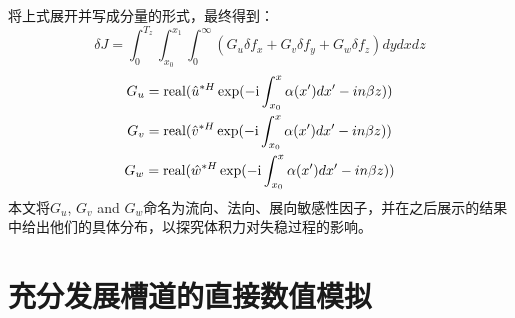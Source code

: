 将上式展开并写成分量的形式，最终得到：
\begin{equation}
\label{e:adjointresult}
\delta J = \int_0^{T_z } {\int_{x_0 }^{x_1 } {\int_0^\infty  {\left( {G_u \delta f_x  + G_v \delta f_y  + G_w \delta f_z } \right)dydxdz} } }
\end{equation}
\begin{equation}
\label{e:G}
\begin{gathered}
G_u  = {\rm real}(\hat u^{*H} \exp({ - {\rm i}\int_{x_0 }^x {\alpha (x')dx'}  - in\beta z}) )\\
G_v  = {\rm real}(\hat v^{*H} \exp({ - {\rm i}\int_{x_0 }^x {\alpha (x')dx'}  - in\beta z}) )\\
G_w  = {\rm real}(\hat w^{*H} \exp({ - {\rm i}\int_{x_0 }^x {\alpha (x')dx'}  - in\beta z}) )\\
\end{gathered}
\end{equation}
本文将$G_u$, $G_v$ and $G_w$命名为流向、法向、展向敏感性因子，并在之后展示的结果中给出他们的具体分布，以探究体积力对失稳过程的影响。
\section{充分发展槽道的直接数值模拟}\label{sec:DNS}

